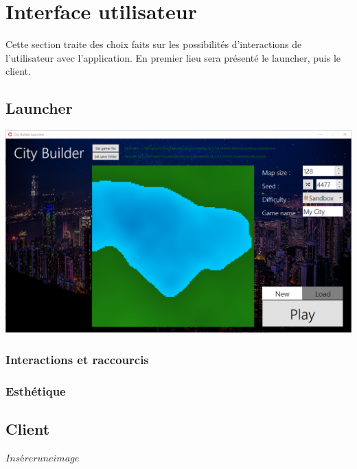 \documentclass[a4paper,10pt,openany,oneside]{report}
\begin{document}
\section{Interface utilisateur}
Cette section traite des choix faits sur les possibilités d'interactions de l'utilisateur avec l'application. En premier lieu sera présenté le launcher, puis le client. 
\subsection{Launcher}
\includegraphics[width=\textwidth]{img/ui_launcher.png}
\subsubsection{Interactions et raccourcis}
\subsubsection{Esthétique}
\subsection{Client}
$Insérer une image$
\end{document}
